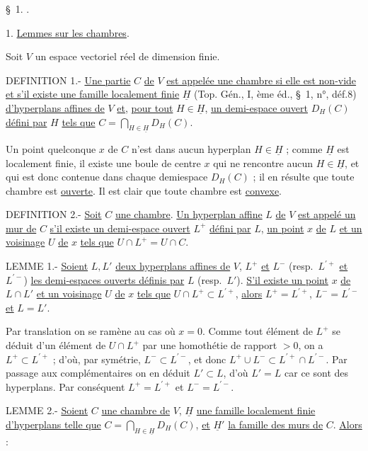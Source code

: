 \hfill {}

\S~1. .

1. \uline{Lemmes sur les chambres}.

Soit $V$ un espace vectoriel réel de dimension finie.

DEFINITION 1.- \uline{Une partie} $C$ \uline{de} $V$ \uline{est appelée une chambre si elle est non-vide et s'il existe une famille localement finie} $\underline H$ (Top. Gén., I, ème éd., \S~1, n°, déf.8) \uline{d'hyperplans affines de} $V$ \uline{et}, \uline{pour tout} $H\in\underline H$, \uline{un demi-espace ouvert} $D_H(C)$ \uline{défini par} $H$ \uline{tels que} $C=\displaystyle\bigcap_{H\in\underline H}D_H(C)$.

Un point quelconque $x$ de $C$ n'est dans aucun hyperplan $H\in\underline H$ ; comme $\underline H$ est localement finie, il existe une boule de centre $x$ qui ne rencontre aucun $H\in\underline H$, et qui est donc contenue dans chaque demiespace $D_H(C)$ ; il en résulte que toute chambre est \uline{ouverte}. Il est clair que toute chambre est \uline{convexe}.

DEFINITION 2.- \uline{Soit} $C$ \uline{une chambre}. \uline{Un hyperplan affine} $L$ \uline{de} $V$ \uline{est appelé un mur de} $C$ \uline{s'il existe un demi-espace ouvert} $L^+$ \uline{défini par} $L$, \uline{un point} $x$ \uline{de} $L$ \uline{et un voisinage} $U$ \uline{de} $x$ \uline{tels que} $U\cap L^+=U\cap C$.

LEMME 1.- \uline{Soient} $L,L'$ \uline{deux hyperplans affines de} $V$, $L^+$ \uline{et} $L^-$ (resp.\ $L^{\prime+}$ \uline{et} $L^{\prime-}$) \uline{les demi-espaces ouverts définis par} $L$ (resp.\ $L'$). \uline{S'il existe un point} $x$ \uline{de} $L\cap L'$ \uline{et un voisinage} $U$ \uline{de} $x$ \uline{tels que} $U\cap L^+\subset L^{\prime+}$, \uline{alors} $L^+=L^{\prime+}$, $L^-=L^{\prime-}$ \uline{et} $L=L'$.

Par translation on se ramène au cas où $x=0$. Comme tout élément de $L^+$ se déduit \margin{\handwritten{\unsure{$>$}}} d'un élément de $U\cap L^+$ par une homothétie de rapport $>0$, on a $L^+\subset L^{\prime+}$ ; d'où, par symétrie, $L^-\subset L^{\prime-}$, et donc $L^+\cup L^-\subset L^{\prime+}\cap L^{\prime-}$. Par passage aux complémentaires on en déduit $L'\subset L$, d'où $L'=L$ car ce sont des hyperplans. Par conséquent $L^+=L^{\prime+}$ et $L^-=L^{\prime-}$.

LEMME 2.- \uline{Soient} $C$ \uline{une chambre de} $V$, $\underline H$ \uline{une famille localement finie d'hyperplans telle que} $C=\displaystyle\bigcap_{H\in\underline H}D_H(C)$, \uline{et} $\underline H'$ \uline{la famille des murs de} $C$. \uline{Alors} :
